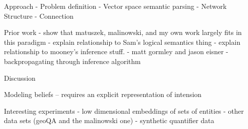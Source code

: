 Approach
- Problem definition
- Vector space semantic parsing
- Network Structure
- Connection 

Prior work
- show that matuszek, malinowski, and my own work largely fits in this paradigm
- explain relationship to Sam's logical semantics thing
- explain relationship to mooney's inference stuff.
- matt gormley and jason eisner - backpropagating through inference algorithm

Discussion

Modeling beliefs -- requires an explicit representation of intension


Interesting experiments
- low dimensional embeddings of sets of entities
- other data sets (geoQA and the malinowski one)
- synthetic quantifier data

